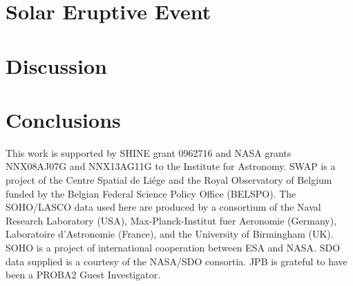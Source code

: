 \documentclass[namedreferences]{solarphysics}
\begin{document}
\begin{article}
\section{Solar Eruptive Event}
\label{sect:event}




\section{Discussion}
\label{sect:discussion}



\section{Conclusions}
\label{sect:conclusions}




%
 \begin{acks}
 
This work is supported by SHINE grant 0962716 and NASA grants NNX08AJ07G and NNX13AG11G to the Institute for Astronomy.
SWAP is a project of the Centre Spatial de Li\'ege and the Royal Observatory of Belgium funded by the Belgian Federal Science Policy Office (BELSPO).
The SOHO/LASCO data used here are produced by a consortium of the Naval Research Laboratory (USA), Max-Planck-Institut fuer Aeronomie (Germany), Laboratoire d'Astronomie (France), and the University of Birmingham (UK). SOHO is a project of international cooperation between ESA and NASA.
SDO data supplied is a courtesy of the NASA/SDO consortia. JPB is grateful to have been a PROBA2 Guest Investigator.

 \end{acks}


%
%
 
   
%
%
%   
%  

\end{article} 
\end{document}
